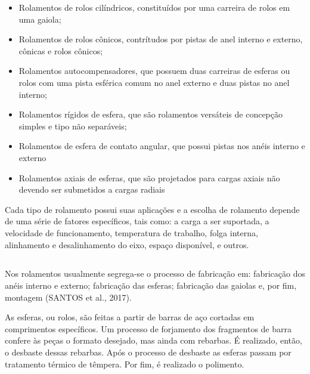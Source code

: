 \documentclass[
	12pt,				
	oneside,			
	a4paper,			
	english,			
	brazil,	
	sumario=abnt-6027-2012		
	]{abntex2ppgsi}
\begin{document}
\begin{itemize}
	\item Rolamentos de rolos cilíndricos, constituídos por uma carreira de rolos em uma gaiola;
	\item Rolamentos de rolos cônicos, contrítudos por pistas de anel interno e externo, cônicas e rolos cônicos;
	\item Rolamentos autocompensadores, que possuem duas carreiras de esferas ou rolos com uma pista esférica comum no anel externo e duas pistas no anel interno;
	\item Rolamentos rígidos de esfera, que são rolamentos versáteis de concepção simples e tipo não separáveis;
	\item Rolamentos de esfera de contato angular, que possui pistas nos anéis interno e externo
	\item Rolamentos axiais de esferas, que são projetados para cargas axiais não devendo ser submetidos a cargas radiais
\end{itemize}

Cada tipo de rolamento possui suas aplicações e a escolha de rolamento depende de uma série de fatores específicos, tais como: a carga a ser suportada, a velocidade de funcionamento, temperatura de trabalho, folga interna, alinhamento e desalinhamento do eixo, espaço disponível, e outros. 

\subsection{}

Nos rolamentos usualmente segrega-se o processo de fabricação em: fabricação dos anéis interno e externo; fabricação das esferas; fabricação das gaiolas e, por fim, montagem (SANTOS et al., 2017).   

As esferas, ou rolos, são feitas a partir de barras de aço cortadas em comprimentos específicos. Um processo de forjamento dos fragmentos de barra confere às peças o formato desejado, mas ainda com rebarbas. É realizado, então, o desbaste dessas rebarbas. Após o processo de desbaste as esferas passam por tratamento térmico de têmpera. Por fim, é realizado o polimento. 
\end{document}
